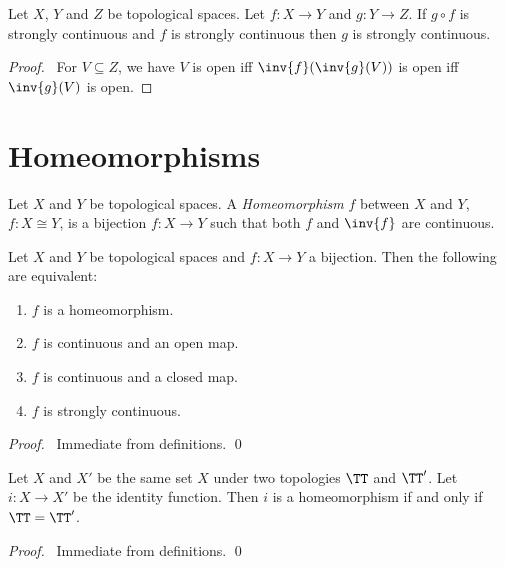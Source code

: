 \begin{proposition}
    \label{proposition:strongly_continuous_strongly_continuous}
    Let $X$, $Y$ and $Z$ be topological spaces.
    Let $f : X \rightarrow Y$ and $g : Y \rightarrow Z$.
    If $g \circ f$ is strongly continuous and $f$ is strongly continuous then 
    $g$ is strongly continuous.
\end{proposition}

\begin{proof}
    \pf\ For $V \subseteq Z$, we have $V$ is open iff $\inv{f}(\inv{g}(V))$ is
    open iff $\inv{g}(V)$ is open.
\end{proof}

\section{Homeomorphisms}

\begin{definition}[Homeomorphism]
    Let $X$ and $Y$ be topological spaces. A \emph{Homeomorphism} $f$ between $X$ and $Y$, $f : X \cong Y$,
    is a bijection $f : X \rightarrow Y$ such that both $f$ and $\inv{f}$ are continuous.
\end{definition}

\begin{lemma}
    \label{lemma:homeomorphism}
    Let $X$ and $Y$ be topological spaces and $f : X \rightarrow Y$ a bijection. Then the following are
    equivalent:
    \begin{enumerate}
        \item $f$ is a homeomorphism.
        \item $f$ is continuous and an open map.
        \item $f$ is continuous and a closed map.
        \item $f$ is strongly continuous.
    \end{enumerate}
\end{lemma}

\begin{proof}
    \pf\ Immediate from definitions. \qed
\end{proof}

\begin{proposition}
    Let $X$ and $X'$ be the same set $X$ under two topologies $\TT$ and $\TT'$. Let $i : X \rightarrow X'$
    be the identity function. Then $i$ is a homeomorphism if and only if $\TT = \TT'$.
\end{proposition}

\begin{proof}
    \pf\ Immediate from definitions. \qed
\end{proof}

